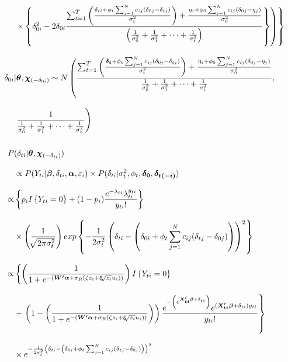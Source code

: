 \documentclass[12pt,a4paper]{article}
\begin{document}
\begin{CJK}{UTF8}{bkai}
\begin{align*}
& \left.\left. \times\left\{\delta_{0i}^2-2\delta_{0i}\frac{\sum_{t=1}^T\left(\frac{\delta_{ti}+\phi_t\sum_{j=1}^N c_{ij}(\delta_{0j}-\delta_{tj})}{\sigma_t^2}\right)+\frac{\eta_i+\phi_0\sum_{j=1}^N c_{ij}(\delta_{0j}-\eta_j)}{\sigma_0^2}}{\left(\frac{1}{\sigma_0^2}+\frac{1}{\sigma_1^2}+\dots+\frac{1}{\sigma_t^2}\right)}\right\}\right)\right\}
\\[3mm]
 \delta_{0i} & |\bm{\theta},\bm{\chi}_{(-\delta_{0i})} \sim N\left(\frac{\sum_{t=1}^T\left(\frac{\bm{\delta_t}+\phi_t\sum_{j=1}^N c_{ij}(\delta_{0j}-\delta_{tj})}{\sigma_t^2}\right)+\frac{\eta_i+\phi_0\sum_{j=1}^N c_{ij}(\delta_{0j}-\eta_j)}{\sigma_0^2}}{\frac{1}{\sigma_0^2}+\frac{1}{\sigma_1^2}+\dots+\frac{1}{\sigma_t^2}},\right. \\[3mm]
  & \left.\frac{1}{\frac{1}{\sigma_0^2}+\frac{1}{\sigma_1^2}+\dots+\frac{1}{\sigma_t^2}}\right)
\\ \hspace*{\fill} \\
 P & (\delta_{ti}|\bm{\theta},\bm{\chi}_{(-\delta_{ti})}) \\[3mm]
& \propto P(Y_{ti}|\bm{\beta},\delta_{ti},\bm{\alpha},\varepsilon_i) \times P(\delta_{ti}|\sigma_t^2,\phi_t,\bm{\delta_0},\bm{\delta_{t(-i)}})\\[3mm]
 \propto &
\left\{ p_i I \left\{ Y_{ti} = 0 \right\}+(1-p_i)\frac{e^{-\lambda_{ti}}\lambda_{ti}^{y_{ti}}}{y_{ti}!}\right\} \\[3mm]
& \times \left(\frac{1}{\sqrt[]{2\pi\sigma_t^2}}\right) exp\left\{-\frac{1}{2\sigma_t^2}\left(\delta_{ti}-\left(\delta_{0i}+\phi_t\sum_{j=1}^N c_{ij}(\delta_{tj}-\delta_{0j})\right)\right)^2\right\} \\[3mm]
 \propto &
\left\{ \left( \frac{1}{1+e^{-(\bm{W^\prime}\bm{\alpha}+\sigma_R(\zeta z_i+\xi \sqrt[]{z_i} u_i))}} \right)I\left\{ Y_{ti} = 0\right\} \right.\\[3mm]
& + \left. \left(1-\left( \frac{1}{1+e^{-(\bm{W^\prime}\bm{\alpha}+\sigma_R(\zeta z_i+\xi \sqrt[]{z_i} u_i))}} \right)\right)\frac{e^{-\left(e^{\bm{X_{ti}^\prime\bm{\beta}}+\delta_{ti}}\right)}e^{(\bm{X_{ti}^\prime\bm{\beta}}+\delta_{ti})y_{ti}}}{y_{ti}!}\right\}\\[3mm]
  & \times
e^{-\frac{1}{2\sigma_t^2}\left(\delta_{ti}-\left(\delta_{0i}+\phi_t\sum_{j=1}^N c_{ij}(\delta_{tj}-\delta_{0j})\right)\right)^2}
\\ \hspace*{\fill} \\

\end{align*}
\end{CJK}
\end{document}
